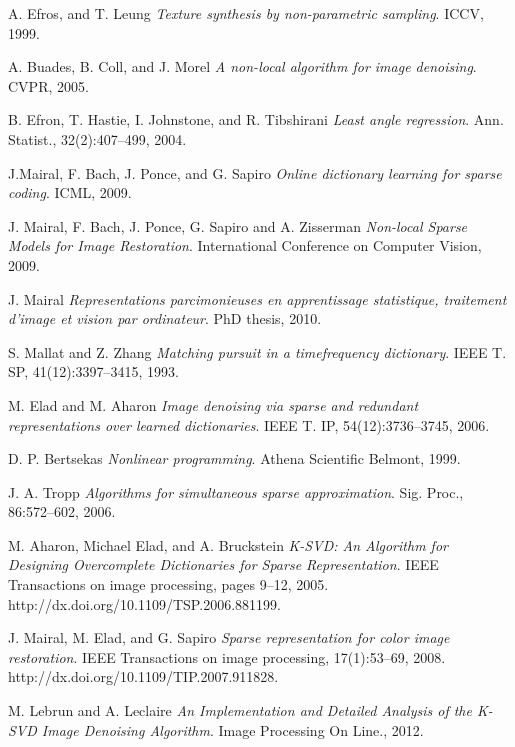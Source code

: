\documentclass{ipol}
\begin{document}
\newpage

\begin{thebibliography}{9}

	A. Efros, and T. Leung
	\emph{Texture synthesis by non-parametric sampling}.
	ICCV,
	1999.

	A. Buades, B. Coll, and J. Morel
	\emph{A non-local algorithm for image denoising}.
	CVPR,
	2005.

	B. Efron, T. Hastie, I. Johnstone, and R. Tibshirani
	\emph{Least angle regression}. 
	Ann. Statist.,
	32(2):407–499,
	2004.

	J.Mairal, F. Bach, J. Ponce, and G. Sapiro
	\emph{Online dictionary learning for sparse coding}.
	ICML,
	2009.

	J. Mairal, F. Bach, J. Ponce, G. Sapiro and A. Zisserman
	\emph{ Non-local Sparse Models for Image Restoration}.
	International Conference on Computer Vision,
	2009.

	J. Mairal
	\emph{ Representations parcimonieuses en apprentissage statistique, traitement d’image et
vision par ordinateur}.
	PhD thesis,
	2010.

	S. Mallat and Z. Zhang
 	\emph{Matching pursuit in a timefrequency dictionary}.
	IEEE T. SP,
	41(12):3397–3415,
	1993.

	M. Elad and M. Aharon
	\emph{Image denoising via sparse and redundant representations over learned dictionaries}.
	IEEE T.
	IP, 54(12):3736–3745,
	2006.
	
	D. P. Bertsekas
	\emph{Nonlinear programming}.
	Athena Scientific Belmont,
	1999.
	
	J. A. Tropp
	\emph{Algorithms for simultaneous sparse approximation}.
	Sig. Proc.,
	86:572–602,
	2006.

	M. Aharon, Michael Elad, and A. Bruckstein
	\emph{K-SVD: An Algorithm for Designing Overcomplete Dictionaries for Sparse Representation}.
	IEEE Transactions on image processing,
	pages 9–12,
	2005.
	http://dx.doi.org/10.1109/TSP.2006.881199.	
	
	J. Mairal, M. Elad, and G. Sapiro
	\emph{Sparse representation for color image restoration}.
	IEEE Transactions on image processing,
	17(1):53–69,
	2008.
	http://dx.doi.org/10.1109/TIP.2007.911828.
	
	M. Lebrun and A. Leclaire
	\emph{{An Implementation and Detailed Analysis of the K-SVD Image Denoising Algorithm}}.
	{{Image Processing On Line}}.,
	2012.

\end{thebibliography}
\end{document}
